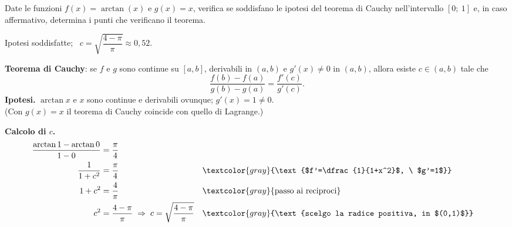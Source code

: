 \begin{question}[ID=1.5, subtitle={Teorema di Cauchy per $\arctan x$ e $x$ su $[0,1]$}, tags={cauchy, teoremi}, difficulty=media]
Date le funzioni \(f(x) = \arctan(x)\) e \(g(x) = x\), verifica se soddisfano le ipotesi del teorema di Cauchy nell'intervallo \([0;\ 1]\) e, in caso affermativo, determina i punti che verificano il teorema.
\begin{solution}
Ipotesi soddisfatte; \ $c=\sqrt{\dfrac{4-\pi}{\pi}}\approx0{,}52$.
\end{solution}
\begin{explanation}
\textbf{Teorema di Cauchy}: se $f$ e $g$ sono continue su $[a,b]$, derivabili in $(a,b)$ e $g'(x)\neq0$ in $(a,b)$, allora esiste $c\in(a,b)$ tale che
\[ \dfrac{f(b)-f(a)}{g(b)-g(a)}=\dfrac{f'(c)}{g'(c)}. \]
\textbf{Ipotesi.} $\arctan x$ e $x$ sono continue e derivabili ovunque; $g'(x)=1\neq0$. \\
(Con $g(x)=x$ il teorema di Cauchy coincide con quello di Lagrange.)

\textbf{Calcolo di $c$.}
\[\begin{aligned}
\dfrac{\arctan1-\arctan0}{1-0} &= \dfrac\pi4\\
\dfrac{1}{1+c^2} &= \dfrac\pi4 && \textcolor{gray}{\text{$f'=\dfrac{1}{1+x^2}$, \ $g'=1$}}\\
1+c^2 &= \dfrac4\pi && \textcolor{gray}{\text{passo ai reciproci}}\\
c^2 &= \dfrac{4-\pi}{\pi} \;\Rightarrow\; c=\sqrt{\dfrac{4-\pi}{\pi}} && \textcolor{gray}{\text{scelgo la radice positiva, in $(0,1)$}}
\end{aligned}\]
\end{explanation}
\end{question}
